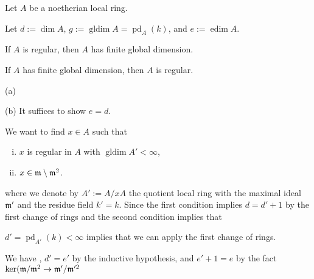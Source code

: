 \documentclass{../../large}
\renewcommand{\pd}{\operatorname{pd}}
\newcommand{\edim}{\operatorname{edim}}
\newcommand{\gldim}{\operatorname{gldim}}
\begin{document}
\begin{prb}
Let $A$ be a noetherian local ring.

Let $d:=\dim A$, $g:=\gldim A=\pd_A(k)$, and $e:=\edim A$.
\begin{parts}
\item If $A$ is regular, then $A$ has finite global dimension.
\item If $A$ has finite global dimension, then $A$ is regular.
\end{parts}
\end{prb}
\begin{pf}
(a)

(b)
It suffices to show $e=d$.


We want to find $x\in A$ such that
\begin{enumerate}[(i)]
\item $x$ is regular in $A$ with $\gldim A'<\infty$,
\item $x\in\mathfrak{m}\setminus\mathfrak{m}^2$.
\end{enumerate}
where we denote by $A':=A/xA$ the quotient local ring with the maximal ideal $\mathfrak{m}'$ and the residue field $k'=k$.
Since the first condition implies $d=d'+1$ by the first change of rings and the second condition implies that

$d'=\pd_{A'}(k)<\infty$ implies that we can apply the first change of rings.



We have , $d'=e'$ by the inductive hypothesis, and $e'+1=e$ by the fact $\ker(\mathfrak{m}/\mathfrak{m}^2\to\mathfrak{m}'/\mathfrak{m}'^2$

\end{pf}
\end{document}

